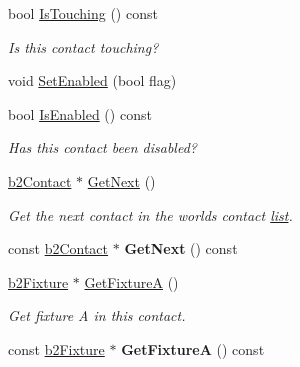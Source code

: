 \begin{DoxyCompactItemize}
\mbox{\label{classb2Contact_a681346f93e2a27403383775a752c06a0}} 
bool \hyperlink{classb2Contact_a681346f93e2a27403383775a752c06a0}{Is\+Touching} () const
\begin{DoxyCompactList}\small\item\em Is this contact touching? \end{DoxyCompactList}\item 
void \hyperlink{classb2Contact_a6edf582f8c161d6632854cddefe55a0c}{Set\+Enabled} (bool flag)
\item 
\mbox{\label{classb2Contact_af81964f40dce556efbc83ae760f166b0}} 
bool \hyperlink{classb2Contact_af81964f40dce556efbc83ae760f166b0}{Is\+Enabled} () const
\begin{DoxyCompactList}\small\item\em Has this contact been disabled? \end{DoxyCompactList}\item 
\mbox{\label{classb2Contact_a34e9c823e5e75bd7d85cfb3dee56e8b7}} 
\hyperlink{classb2Contact}{b2\+Contact} $\ast$ \hyperlink{classb2Contact_a34e9c823e5e75bd7d85cfb3dee56e8b7}{Get\+Next} ()
\begin{DoxyCompactList}\small\item\em Get the next contact in the world\textquotesingle{}s contact \hyperlink{protocollist-p}{list}. \end{DoxyCompactList}\item 
\mbox{\label{classb2Contact_a5aee8ee4b446f160d87fb8a0e545107e}} 
const \hyperlink{classb2Contact}{b2\+Contact} $\ast$ {\bfseries Get\+Next} () const
\item 
\mbox{\label{classb2Contact_a1282b0508d7fb8fcf6c093c277da6468}} 
\hyperlink{classb2Fixture}{b2\+Fixture} $\ast$ \hyperlink{classb2Contact_a1282b0508d7fb8fcf6c093c277da6468}{Get\+FixtureA} ()
\begin{DoxyCompactList}\small\item\em Get fixture A in this contact. \end{DoxyCompactList}\item 
\mbox{\label{classb2Contact_a6879ebaeaea6549d951f09fcebe8248a}} 
const \hyperlink{classb2Fixture}{b2\+Fixture} $\ast$ {\bfseries Get\+FixtureA} () const

\end{DoxyCompactItemize}
